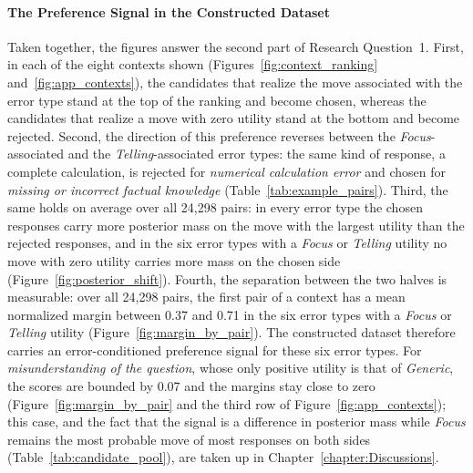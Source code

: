     \paragraph{The Preference Signal in the Constructed Dataset}
    Taken together, the figures answer the second part of Research Question~1. First, in each of the eight contexts shown (Figures~\ref{fig:context_ranking} and~\ref{fig:app_contexts}), the candidates that realize the move associated with the error type stand at the top of the ranking and become chosen, whereas the candidates that realize a move with zero utility stand at the bottom and become rejected. Second, the direction of this preference reverses between the \textit{Focus}-associated and the \textit{Telling}-associated error types: the same kind of response, a complete calculation, is rejected for \textit{numerical calculation error} and chosen for \textit{missing or incorrect factual knowledge} (Table~\ref{tab:example_pairs}). Third, the same holds on average over all 24,298 pairs: in every error type the chosen responses carry more posterior mass on the move with the largest utility than the rejected responses, and in the six error types with a \textit{Focus} or \textit{Telling} utility no move with zero utility carries more mass on the chosen side (Figure~\ref{fig:posterior_shift}). Fourth, the separation between the two halves is measurable: over all 24,298 pairs, the first pair of a context has a mean normalized margin between 0.37 and 0.71 in the six error types with a \textit{Focus} or \textit{Telling} utility (Figure~\ref{fig:margin_by_pair}). The constructed dataset therefore carries an error-conditioned preference signal for these six error types. For \textit{misunderstanding of the question}, whose only positive utility is that of \textit{Generic}, the scores are bounded by 0.07 and the margins stay close to zero (Figure~\ref{fig:margin_by_pair} and the third row of Figure~\ref{fig:app_contexts}); this case, and the fact that the signal is a difference in posterior mass while \textit{Focus} remains the most probable move of most responses on both sides (Table~\ref{tab:candidate_pool}), are taken up in Chapter~\ref{chapter:Discussions}.
